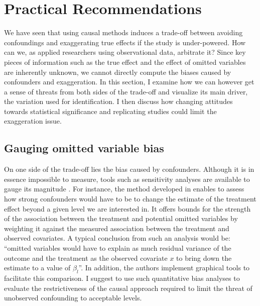 \documentclass[usletter, 12pt]{article}
\begin{document}


	\section{Practical Recommendations} \label{discussion}

 		We have seen that using causal methods induces a trade-off between avoiding confoundings and exaggerating true effects if the study is under-powered. How can we, as applied researchers using observational data, arbitrate it? Since key pieces of information such as the true effect and the effect of omitted variables are inherently unknown, we cannot directly compute the biases caused by confounders and exaggeration. In this section, I examine how we can however get a sense of threats from both sides of the trade-off and visualize its main driver, the variation used for identification. I then discuss how changing attitudes towards statistical significance and replicating studies could limit the exaggeration issue.
	
	
		\subsection{Gauging omitted variable bias}
	
			On one side of the trade-off lies the bias caused by confounders. Although it is in essence impossible to measure, tools such as sensitivity analyses are available to gauge its magnitude \citep{rosenbaum_observational_2002, middleton_bias_2016, oster_unobservable_2019, cinelli_making_2020}. For instance, the method developed in \cite{cinelli_making_2020} enables to assess how strong confounders would have to be to change the estimate of the treatment effect beyond a given level we are interested in. It offers bounds for the strength of the association between the treatment and potential omitted variables by weighting it against the measured association between the treatment and observed covariates. A typical conclusion from such an analysis would be: ``omitted variables would have to explain as much residual variance of the outcome and the treatment as the observed covariate $x$ to bring down the estimate to a value of $\beta_{l}$''. In addition, the authors implement graphical tools to facilitate this comparison. I suggest to use such quantitative bias analyses to evaluate the restrictiveness of the causal approach required to limit the threat of unobserved confounding to acceptable levels. 
			
\end{document}
